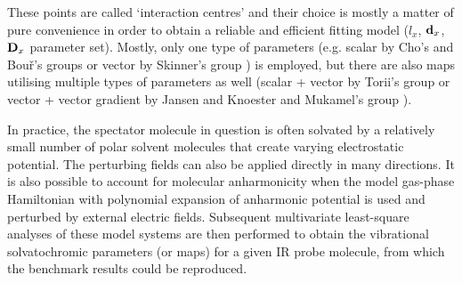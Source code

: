 \documentclass[a4paper,titlepage,twoside,fleqn,12pt]{book}
\begin{document}
\begin{refsection}
These points are called `interaction centres' and their
choice is mostly a matter of pure convenience in order to obtain a reliable and efficient
fitting model ($l_x$, ${\bf d}_x$, ${\bf D}_x$ parameter set). Mostly, only one type of parameters
(e.g. scalar by Cho's and Bou\v{r}'s groups \citep{Kwac.Cho.II.JCP.2003,Ham.Kim.Lee.Cho.JCP.2003,
Bour.Keiderling.JCP.2003,Hahn.Lee.Cho.JCP.2004,Kwac.Lee.Cho.JCP.2004,
Choi.Hahn.Cho.IJQC.2005,Kwac.Cho.JRS.2005,
Choi.Oh.Lee.Lee.Cho.JCP.2008,Oh.Choi.Lee.Han.Lee.Cho.JCP.2008,
Choi.Oh.Cho.JCP.2008,Lee.Choi.Cho.PCCP.2010,Choi.Cho.JCP.2011,
Choi.Raleigh.Cho.JCPL.2011,Lee.Choi.Cho.JCP.2012}
or vector by Skinner's group \citep{Schmidt.Corcelli.Skinner.JCP.2004,
Corcelli.Lawrence.Skinner.JCP.2004}) is employed, but there are also maps utilising multiple types of parameters
as well (scalar + vector by Torii's group \citep{Torii.JCPL.2015,Torii.Noge.PCCP.2016} 
or vector + vector gradient by Jansen and Knoester \citep{Jansen.Knoester.JCP.2006}
and Mukamel's group \citep{Hayashi.Jansen.Zhuang.Mukamel.JPCA.2005,Hayashi.Zhuang.Mukamel.JPCA.2005}).
 
In practice, the spectator molecule in question is often solvated by a relatively small number of polar 
solvent molecules that create varying electrostatic potential. \citep{Bour.Keiderling.JCP.2003,
Lin.Shorb.Mukherjee.Zanni.Skinner.JPCB.2009,
Lee.Choi.Cho.JCP.2012} 
The perturbing fields can also be applied directly
in many directions. \citep{Jansen.Dijkstra.Watson.Hirst.Knoester.JCP.2006,
Jansen.Knoester.JCP.2006,Roy.Lessing.Meisl.Ganim.Tokmakoff.Knoester.Jansen.JCP.2011,
Hayashi.Jansen.Zhuang.Mukamel.JPCA.2005,
Hayashi.Zhuang.Mukamel.JPCA.2005,Bour.Michalik.Kapitan.JCP.2005} 
It is also possible to account for molecular anharmonicity
when the model gas\hyp{}phase Hamiltonian with polynomial expansion of anharmonic potential
is used and perturbed by external electric fields. \citep{Jansen.Knoester.JCP.2006}
Subsequent multivariate
least-square analyses of these model systems are then performed to obtain the vibrational 
solvatochromic parameters (or maps) for a given IR probe molecule, from which the benchmark
results could be reproduced. 


\end{refsection}
\end{document}
